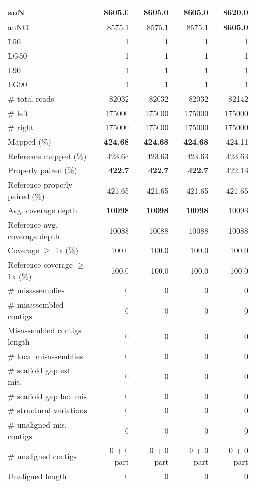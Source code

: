 \documentclass[12pt,a4paper]{article}
\begin{document}
\begin{table}[ht]
\begin{center}
\begin{tabular}{|l*{4}{|r}|}
auN & 8605.0 & 8605.0 & 8605.0 & {\bf 8620.0} \\ \hline
auNG & 8575.1 & 8575.1 & 8575.1 & {\bf 8605.0} \\ \hline
L50 & 1 & 1 & 1 & 1 \\ \hline
LG50 & 1 & 1 & 1 & 1 \\ \hline
L90 & 1 & 1 & 1 & 1 \\ \hline
LG90 & 1 & 1 & 1 & 1 \\ \hline
\# total reads & 82032 & 82032 & 82032 & 82142 \\ \hline
\# left & 175000 & 175000 & 175000 & 175000 \\ \hline
\# right & 175000 & 175000 & 175000 & 175000 \\ \hline
Mapped (\%) & {\bf 424.68} & {\bf 424.68} & {\bf 424.68} & 424.11 \\ \hline
Reference mapped (\%) & 423.63 & 423.63 & 423.63 & 423.63 \\ \hline
Properly paired (\%) & {\bf 422.7} & {\bf 422.7} & {\bf 422.7} & 422.13 \\ \hline
Reference properly paired (\%) & 421.65 & 421.65 & 421.65 & 421.65 \\ \hline
Avg. coverage depth & {\bf 10098} & {\bf 10098} & {\bf 10098} & 10093 \\ \hline
Reference avg. coverage depth & 10088 & 10088 & 10088 & 10088 \\ \hline
Coverage $\geq$ 1x (\%) & 100.0 & 100.0 & 100.0 & 100.0 \\ \hline
Reference coverage $\geq$ 1x (\%) & 100.0 & 100.0 & 100.0 & 100.0 \\ \hline
\# misassemblies & 0 & 0 & 0 & 0 \\ \hline
\# misassembled contigs & 0 & 0 & 0 & 0 \\ \hline
Misassembled contigs length & 0 & 0 & 0 & 0 \\ \hline
\# local misassemblies & 0 & 0 & 0 & 0 \\ \hline
\# scaffold gap ext. mis. & 0 & 0 & 0 & 0 \\ \hline
\# scaffold gap loc. mis. & 0 & 0 & 0 & 0 \\ \hline
\# structural variations & 0 & 0 & 0 & 0 \\ \hline
\# unaligned mis. contigs & 0 & 0 & 0 & 0 \\ \hline
\# unaligned contigs & 0 + 0 part & 0 + 0 part & 0 + 0 part & 0 + 0 part \\ \hline
Unaligned length & 0 & 0 & 0 & 0 \\ \hline

\end{tabular}
\end{center}
\end{table}
\end{document}
